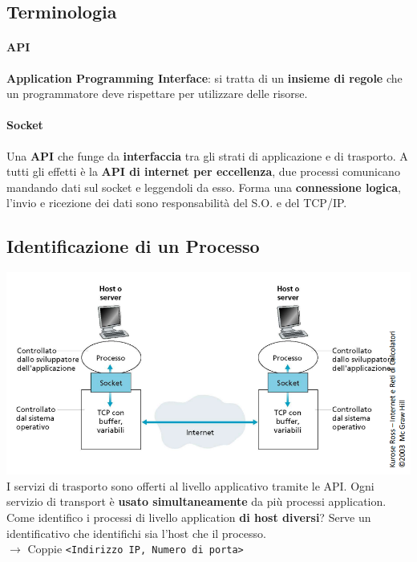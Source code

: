 \documentclass[10pt]{article}
\begin{document}
\subsection{Terminologia}
\paragraph{API} \textbf{Application Programming Interface}: si tratta di un \textbf{insieme di regole} che un programmatore deve rispettare per utilizzare delle risorse.
\paragraph{Socket} Una \textbf{API} che funge da \textbf{interfaccia} tra gli strati di applicazione e di trasporto. A tutti gli effetti è la \textbf{API di internet per eccellenza}, due processi comunicano mandando dati sul socket e leggendoli da esso. Forma una \textbf{connessione logica}, l'invio e ricezione dei dati sono responsabilità del S.O. e del TCP/IP.
\subsection{Identificazione di un Processo}
\includegraphics[scale=0.73]{identifprocesso.png}
I servizi di trasporto sono offerti al livello applicativo tramite le API. Ogni servizio di transport è \textbf{usato simultaneamente} da più processi application.\\
Come identifico i processi di livello application \textbf{di host diversi}? Serve un identificativo che identifichi sia l'host che il processo.\\
$\rightarrow$ Coppie \texttt{<Indirizzo IP, Numero di porta>}
\begin{center}
\end{center}
\end{document}
